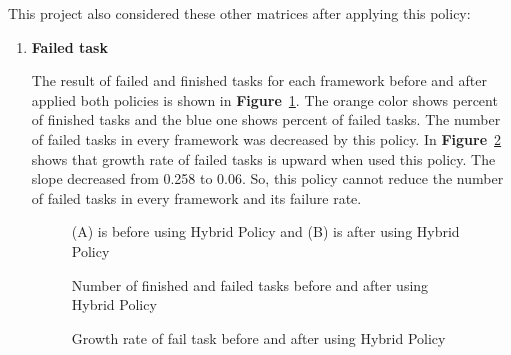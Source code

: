 \documentclass[12pt,oneside,openright,a4paper]{cpe-english-project}
\begin{document}
This project also considered these other matrices after applying this policy: 
\begin{enumerate}

  \item \textbf{Failed task}
  
\hspace{10mm}The result of failed and finished tasks for each framework before and after applied both policies is shown in  \textbf{Figure}~\ref{fig:finfail0-3}. The orange color shows percent of finished tasks and the blue one shows percent of failed tasks. The number of failed tasks in every framework was decreased by this policy. In \textbf{Figure}~\ref{fig:fail3} shows that growth rate of failed tasks is upward when used this policy. The slope decreased from 0.258 to 0.06. So, this policy cannot reduce the number of failed tasks in every framework and its failure rate.
  
  \begin{figure}[!h]\centering
    \setlength{\fboxrule}{0mm} %
    \setlength{\fboxsep}{0cm}
    \caption{Number of finished and failed tasks before and after using Hybrid Policy}\label{fig:finfail0-3}
    (A) is before using Hybrid Policy and (B) is  after using Hybrid Policy
\end{figure}

\begin{figure}[!h]\centering
    \setlength{\fboxrule}{0mm} %
    \setlength{\fboxsep}{0cm}
    \caption{Growth rate of fail task before and after using Hybrid Policy}\label{fig:fail3}
\end{figure}


\end{enumerate}
\end{document}
